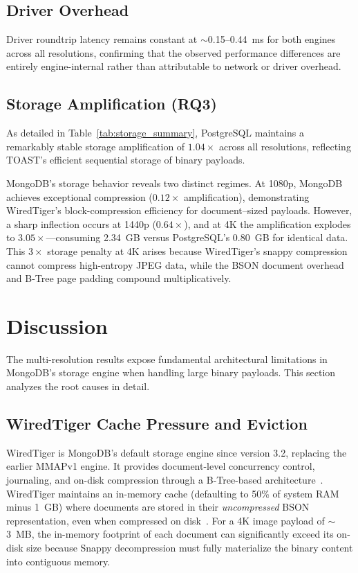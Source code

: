 \documentclass[conference]{IEEEtran}
\begin{document}
\subsection{Driver Overhead}
\label{subsec:driver_overhead}
Driver roundtrip latency remains constant at $\sim$0.15--0.44~ms for both engines across all resolutions, confirming that the observed performance differences are entirely engine-internal rather than attributable to network or driver overhead.


\subsection{Storage Amplification (RQ3)}
\label{subsec:storage_size}
As detailed in Table~\ref{tab:storage_summary}, PostgreSQL maintains a remarkably stable storage amplification of $1.04\times$ across all resolutions, reflecting TOAST's efficient sequential storage of binary payloads.

MongoDB's storage behavior reveals two distinct regimes. At 1080p, MongoDB achieves exceptional compression ($0.12\times$ amplification), demonstrating WiredTiger's block-compression efficiency for document--sized payloads. However, a sharp inflection occurs at 1440p ($0.64\times$), and at 4K the amplification explodes to $3.05\times$---consuming 2.34~GB versus PostgreSQL's 0.80~GB for identical data. This $3\times$ storage penalty at 4K arises because WiredTiger's snappy compression cannot compress high-entropy JPEG data, while the BSON document overhead and B-Tree page padding compound multiplicatively.


\section{Discussion}
\label{sec:discussion}

The multi-resolution results expose fundamental architectural limitations in MongoDB's storage engine when handling large binary payloads. This section analyzes the root causes in detail.

\subsection{WiredTiger Cache Pressure and Eviction}
WiredTiger is MongoDB's default storage engine since version 3.2, replacing the earlier MMAPv1 engine. It provides document-level concurrency control, journaling, and on-disk compression through a B-Tree-based architecture~\cite{mongodb_wiredtiger_storage}. WiredTiger maintains an in-memory cache (defaulting to 50\% of system RAM minus 1~GB) where documents are stored in their \emph{uncompressed} BSON representation, even when compressed on disk~\cite{mongodb_wiredtiger_storage}. For a 4K image payload of $\sim$3~MB, the in-memory footprint of each document can significantly exceed its on-disk size because Snappy decompression must fully materialize the binary content into contiguous memory.
\end{document}
